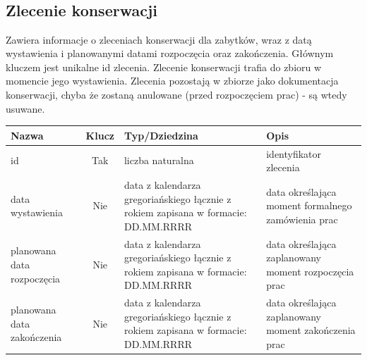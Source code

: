 \documentclass{article}
\begin{document}
\subsection*{\\ Zlecenie konserwacji}
Zawiera informacje o zleceniach konserwacji dla zabytków, wraz z datą wystawienia i planowanymi datami rozpoczęcia oraz zakończenia. Głównym kluczem jest unikalne id zlecenia. Zlecenie konserwacji trafia do zbioru w momencie jego wystawienia. Zlecenia pozostają w zbiorze jako dokumentacja konserwacji, chyba że zostaną anulowane (przed rozpoczęciem prac) - są wtedy usuwane.  
\begin{longtable}{|C{3cm}|c|C{4.5cm}|C{5cm}|}
\hline
\textbf{Nazwa} & \textbf{Klucz} & \textbf{Typ/Dziedzina} & \textbf{Opis} \\ \hline
id & Tak & liczba naturalna & identyfikator zlecenia \\ \hline 
data wystawienia & Nie & data z kalendarza gregoriańskiego łącznie z rokiem zapisana w formacie: DD.MM.RRRR  & data określająca moment formalnego zamówienia prac \\ \hline 
planowana data rozpoczęcia & Nie & data z kalendarza gregoriańskiego łącznie z rokiem zapisana w formacie: DD.MM.RRRR  & data określająca zaplanowany moment rozpoczęcia prac \\ \hline
planowana data zakończenia & Nie & data z kalendarza gregoriańskiego łącznie z rokiem zapisana w formacie: DD.MM.RRRR  & data określająca zaplanowany moment zakończenia prac \\ \hline
\end{longtable}
\end{document}
